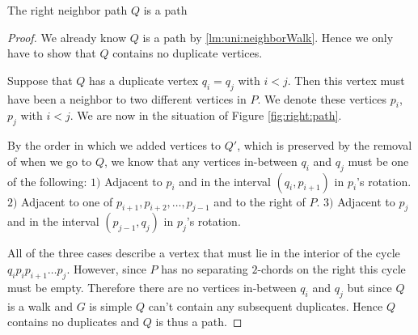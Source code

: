   \begin{lemma}
    \label{lm:uni:neighborPath}
    The right neighbor path $Q$ is a path
  \end{lemma}
  \begin{proof}
    We already know $Q$ is a path by \ref{lm:uni:neighborWalk}. Hence we only have to show that $Q$ contains no duplicate vertices.

    Suppose that $Q$ has a duplicate vertex $q_i=q_j$ with $i<j$. Then this vertex must have been a neighbor to two different vertices in $P$. We denote these vertices $p_i$, $p_j$ with $i<j$. We are now in the situation of Figure \ref{fig:right:path}.

    By the order in which we added vertices to $Q'$, which is preserved by the removal of when we go to $Q$, we know that any vertices in-between $q_i$ and $q_j$ must be one of the following: $1)$ Adjacent to $p_i$ and in the interval $(q_i, p_{i+1})$ in $p_i$'s rotation. $2)$ Adjacent to one of $p_{i+1},  p_{i+2},\ldots, p_{j-1}$ and to the right of $P$. $3)$ Adjacent to $p_j$ and in the interval $(p_{j-1}, q_j)$ in $p_j$'s rotation.

    All of the three cases describe a vertex that must lie in the interior of the cycle $q_i p_i p_{i+1} \ldots p_j$. However, since $P$ has no separating $2$-chords on the right this cycle must be empty. Therefore there are no vertices in-between $q_i$ and $q_j$ but since $Q$ is a walk and $G$ is simple $Q$ can't contain any subsequent duplicates. Hence $Q$ contains no duplicates and $Q$ is thus a path.
  \end{proof}


